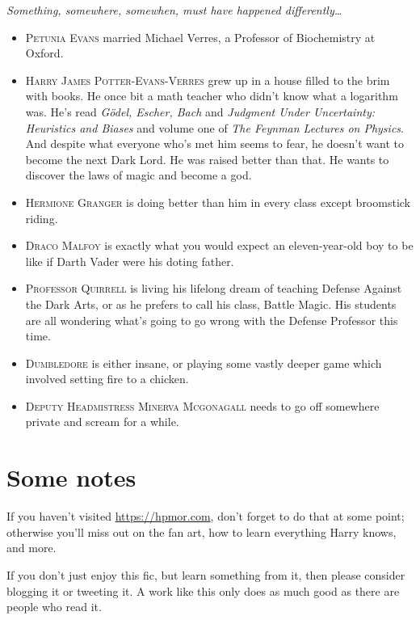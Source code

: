 \begin{parsepskip}
\centerline{\textit{Something, somewhere, somewhen, must have happened differently{\ldots}}}

\begin{itemize}
\item \textsc{Petunia Evans} married Michael Verres, a Professor of Biochemistry at Oxford.
\item \textsc{Harry James Potter-Evans-Verres} grew up in a house filled to the brim with books. He once bit a math teacher who didn't know what a logarithm was. He's read \emph{Gödel, Escher, Bach} and \emph{Judgment Under Uncertainty: Heuristics and Biases} and volume one of \emph{The Feynman Lectures on Physics}. And despite what everyone who's met him seems to fear, he doesn't want to become the next Dark Lord. He was raised better than that. He wants to discover the laws of magic and become a god.
\item \textsc{Hermione Granger} is doing better than him in every class except broomstick riding.
\item \textsc{Draco Malfoy} is exactly what you would expect an eleven-year-old boy to be like if Darth Vader were his doting father.
\item \textsc{Professor Quirrell} is living his lifelong dream of teaching Defense Against the Dark Arts, or as he prefers to call his class, Battle Magic. His students are all wondering what's going to go wrong with the Defense Professor this time.
\item \textsc{Dumbledore} is either insane, or playing some vastly deeper game which involved setting fire to a chicken.
\item \textsc{Deputy Headmistress Minerva Mcgonagall} needs to go off somewhere private and scream for a while.
\end{itemize}
\end{parsepskip}

%
%

\section*{Some notes}
If you haven't visited \url{https://hpmor.com}, don't forget to do that at some point; otherwise you'll miss out on the fan art, how to learn everything Harry knows, and more.

If you don't just enjoy this fic, but learn something from it, then please consider blogging it or tweeting it. A work like this only does as much good as there are people who read it.


